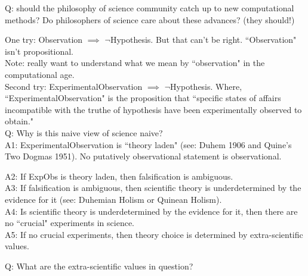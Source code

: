 Q: should the philosophy of science community catch up to new computational methods? Do philosophers of science care about these advances?  (they should!) \\


One try: Observation $\implies$ $\neg$Hypothesis. But that can't be right. ``Observation" isn't propositional. \\

Note: really want to understand what we mean by ``observation" in the computational age. \\

Second try: ExperimentalObservation $\implies$ $\neg$Hypothesis. Where, ``ExperimentalObservation" is the proposition that ``specific states of affairs incompatible with the truthe of hypothesis have been experimentally observed to obtain." \\

Q: Why is this naive view of science naive? \\

A1: ExperimentalObservation is ``theory laden" (see: Duhem 1906 and Quine's Two Dogmas 1951). No putatively observational statement is observational. %


A2: If ExpObs is theory laden, then falsification is ambiguous. \\

A3: If falsification is ambiguous, then scientific theory is underdetermined by the evidence for it (see: Duhemian Holism or Quinean Holism). \\

A4: Is scientific theory is underdetermined by the evidence for it, then there are no ``crucial" experiments in science. \\

A5: If no crucial experiments, then theory choice is determined by extra-scientific values.


Q: What are the extra-scientific values in question? \\

